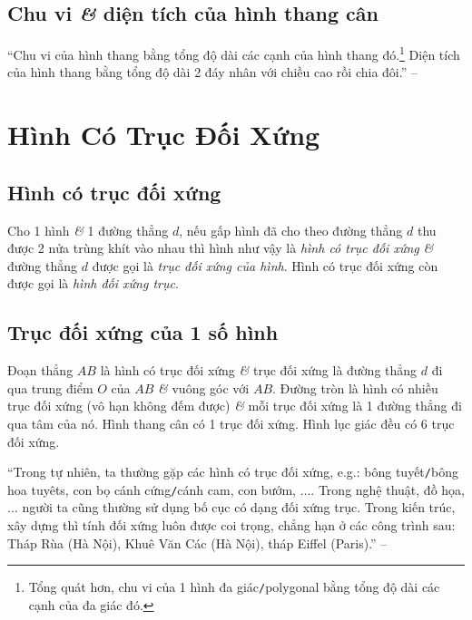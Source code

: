 \documentclass[oneside]{book}
\numberwithin{equation}{section}
\begin{document}
\subsection{Chu vi \textit{\&} diện tích của hình thang cân}
``Chu vi của hình thang bằng tổng độ dài các cạnh của hình thang đó.\footnote{Tổng quát hơn, chu vi của 1 hình đa giác\texttt{/}polygonal bằng tổng độ dài các cạnh của đa giác đó.} Diện tích của hình thang bằng tổng độ dài 2 đáy nhân với chiều cao rồi chia đôi.'' -- \cite[p. 106]{Thai_Anh_Dat_Ha_Loan_Nam_Quang_Toan_6_tap_1}


\section{Hình Có Trục Đối Xứng}

\subsection{Hình có trục đối xứng}
Cho 1 hình \textit{\&} 1 đường thẳng $d$, nếu gấp hình đã cho theo đường thẳng $d$ thu được 2 nửa trùng khít vào nhau thì hình như vậy là \textit{hình có trục đối xứng} \textit{\&} đường thẳng $d$ được gọi là \textit{trục đối xứng của hình}. Hình có trục đối xứng còn được gọi là \textit{hình đối xứng trục}.

\subsection{Trục đối xứng của 1 số hình}
Đoạn thẳng $AB$ là hình có trục đối xứng \textit{\&} trục đối xứng là đường thẳng $d$ đi qua trung điểm $O$ của $AB$ \textit{\&} vuông góc với $AB$. Đường tròn là hình có nhiều trục đối xứng (vô hạn không đếm được) \textit{\&} mỗi trục đối xứng là 1 đường thẳng đi qua tâm của nó. Hình thang cân có 1 trục đối xứng. Hình lục giác đều có 6 trục đối xứng.

``Trong tự nhiên, ta thường gặp các hình có trục đối xứng, e.g.: bông tuyết\texttt{/}bông hoa tuyêts, con bọ cánh cứng\texttt{/}cánh cam, con bướm, $\ldots$. Trong nghệ thuật, đồ họa, $\ldots$ người ta cũng thường sử dụng bố cục có dạng đối xứng trục. Trong kiến trúc, xây dựng thì tính đối xứng luôn được coi trọng, chẳng hạn ở các công trình sau: Tháp Rùa (Hà Nội), Khuê Văn Các (Hà Nội), tháp Eiffel (Paris).'' -- \cite[p. 110]{Thai_Anh_Dat_Ha_Loan_Nam_Quang_Toan_6_tap_1}
\end{document}
